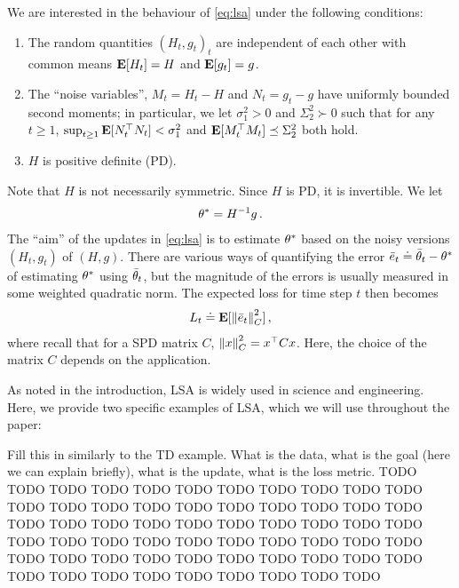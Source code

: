 We are interested in the behaviour of \eqref{eq:lsa} under the following conditions:
\begin{assumption}\label{genlsa}
\mbox{}
\vspace*{-0.14in}

\begin{enumerate}
\item\label{mart} 
The random quantities $(H_t,g_t)_t$  are independent of each other with common means $\mathbf{E}[ H_t] = H$ and $\mathbf{E}[g_t] = g$.

\item \label{noise} The ``noise variables'', $M_t = H_t - H$ and $N_t = g_t - g$ have uniformly bounded second moments;
in particular, we let $\sigma_1^2>0$ and $\Sigma_2^2\succ 0$ such that for any $t\ge 1$,
$\sup_{t\ge 1} \mathbf{E}[N_t^\top N_t]<\sigma_1^2$ and
$\mathbf{E}[M_t^\top M_t]\preceq \Sigma_2^2$ both hold.

\item \label{mat} $H$ is positive definite (PD). %
\end{enumerate}
\end{assumption}
Note that $H$ is not necessarily symmetric.
Since $H$ is PD, it is invertible. We let
\begin{align*}
\theta^* = H^{-1} g\,.
\end{align*}
The ``aim'' of the updates in \eqref{eq:lsa} is to estimate $\theta^*$ based on the noisy versions $(H_t,g_t)$ of $(H,g)$.
There are various ways of quantifying the error $\bar{e}_t \doteq \bar{\theta}_t - \theta^*$ of estimating $\theta^*$ using $\bar{\theta}_t$, but the magnitude
of the errors is usually measured in some weighted quadratic norm. The expected loss for time step $t$ then becomes
\begin{align*}
L_t \doteq \mathbf{E}[ \left\| \bar{e}_t\right\|_{C}^2 ]\,,
\end{align*}
where recall that for a SPD matrix $C$, $\left\| x\right\|_C^2 = x^\top C x$.
Here, the choice of the matrix $C$ depends on the application.


As noted in the introduction, LSA is widely used in science and engineering. Here, we provide two specific examples
of LSA, which we will use throughout the paper:
\begin{example}
Fill this in similarly to the TD example. What is the data, what is the goal (here we can explain briefly),
what is the update, what is the loss metric.
TODO TODO TODO TODO TODO TODO TODO TODO TODO TODO TODO TODO 
TODO TODO TODO TODO TODO TODO TODO TODO TODO TODO TODO TODO 
TODO TODO TODO TODO TODO TODO TODO TODO TODO TODO TODO TODO 
TODO TODO TODO TODO TODO TODO TODO TODO TODO TODO TODO TODO 
TODO TODO TODO TODO TODO TODO TODO TODO TODO TODO TODO TODO 
\end{example}

